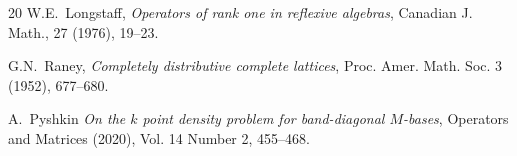 \documentclass[12pt,oneside,a4paper]{amsart}
\begin{document}
\begin {thebibliography}{20}
    W.E.~\!Longstaff,
    \emph{Operators of rank one in reflexive algebras},
    Canadian J. Math., 27 (1976), 19--23.

    G.N.~\!Raney,
    \emph{Completely distributive complete lattices},
    Proc. Amer. Math. Soc. 3 (1952), 677--680.

    A.~\!Pyshkin
    \emph{On the $k$ point density problem for band-diagonal $M$-bases},
    Operators and Matrices (2020), Vol. 14 Number 2, 455--468.


\end{thebibliography}
\end{document}
